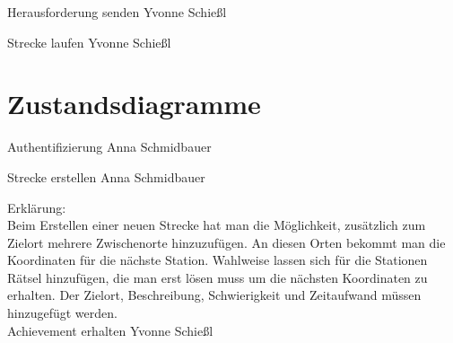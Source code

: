 \documentclass[a4paper, 12pt]{article}
\begin{document}
{\Large Herausforderung senden}
Yvonne Schießl
\begin{figure}[H] 
\centering
	\fbox{\begin{minipage}{16cm} 
	\end{minipage}}
\end{figure}

{\Large Strecke laufen}
Yvonne Schießl
\begin{figure}[H] 
\centering
	\fbox{\begin{minipage}{16cm} 
	\end{minipage}}
\end{figure}

\section{Zustandsdiagramme}

{\Large Authentifizierung}
Anna Schmidbauer
\begin{figure}[H] 
\centering
	\fbox{\begin{minipage}{16cm} 
	\end{minipage}}
\end{figure}


{\Large Strecke erstellen}
Anna Schmidbauer
\begin{figure}[H] 
\centering
	\fbox{\begin{minipage}{16cm} 
	\end{minipage}}
\end{figure}

Erklärung:\\
Beim Erstellen einer neuen Strecke hat man die Möglichkeit, zusätzlich zum Zielort mehrere Zwischenorte hinzuzufügen. An diesen Orten bekommt man die Koordinaten für die nächste Station. Wahlweise lassen sich für die Stationen Rätsel hinzufügen, die man erst lösen muss um die nächsten Koordinaten zu erhalten. Der Zielort, Beschreibung, Schwierigkeit und Zeitaufwand müssen hinzugefügt werden.\\

{\Large Achievement erhalten}
Yvonne Schießl
\begin{figure}[H] 
\centering
	\fbox{\begin{minipage}{16cm} 
	\end{minipage}}
\end{figure}
\end{document}
